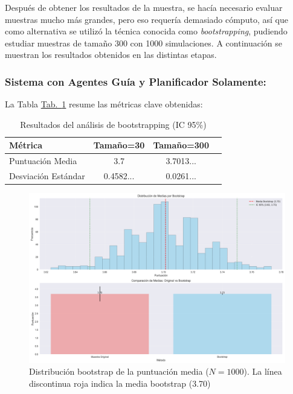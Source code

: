 \documentclass[10pt]{llncs}
\newcommand{\tabref}[1]{\hyperref[#1]{Tab.~\ref*{#1}}}
\begin{document}
Después de obtener los resultados de la muestra, se hacía necesario evaluar muestras mucho más grandes, pero eso requería demasiado cómputo, así que como alternativa se utilizó la técnica conocida como \textit{bootstrapping}, pudiendo estudiar muestras de tamaño 300 con 1000 simulaciones. A continuación se muestran los resultados obtenidos 
en las distintas etapas.

\subsubsection{Sistema con Agentes Guía y Planificador Solamente:}

La Tabla \tabref{tab:boot_results_1} resume las métricas clave obtenidas:

\begin{table}[h]
\centering
\caption{Resultados del análisis de bootstrapping (IC 95\%)}
\label{tab:boot_results_1}
\begin{tabular}{lccc}
\hline
\textbf{Métrica} & \textbf{Tamaño=30} & \textbf{Tamaño=300}  \\
\hline 
Puntuación Media& 3.7 & 3.7013...  \\
Desviación Estándar & 0.4582... & 0.0261...  \\
\hline
\end{tabular}
\end{table}

\begin{figure}[h]
\centering
\includegraphics[width=1\textwidth]{../src/experiments/one_only_agent/bootstrap_distribution_20250614-143724.png}
\caption{Distribución bootstrap de la puntuación media ($N=1000$). La línea discontinua roja indica la media bootstrap (3.70)}
\label{fig:boot_dist_1}
\end{figure}
\end{document}

